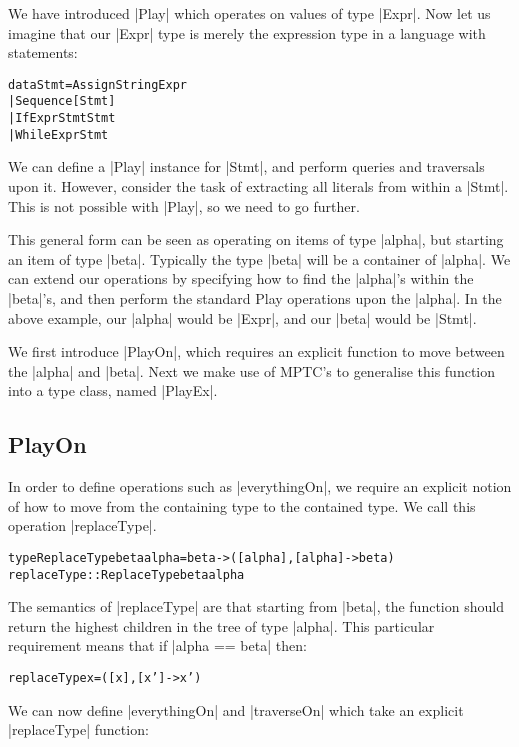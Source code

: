 \documentclass[preprint]{sigplanconf}
\newenvironment{code}{\begin{alltt}\small}{\end{alltt}}
\begin{document}
We have introduced |Play| which operates on values of type |Expr|. Now let us imagine that our |Expr| type is merely the expression type in a language with statements:

\begin{code}
data Stmt  =  Assign String Expr
           |  Sequence [Stmt]
           |  If Expr Stmt Stmt
           |  While Expr Stmt
\end{code}

We can define a |Play| instance for |Stmt|, and perform queries and traversals upon it. However, consider the task of extracting all literals from within a |Stmt|. This is not possible with |Play|, so we need to go further.

This general form can be seen as operating on items of type |alpha|, but starting an item of type |beta|. Typically the type |beta| will be a container of |alpha|. We can extend our operations by specifying how to find the |alpha|'s within the |beta|'s, and then perform the standard Play operations upon the |alpha|. In the above example, our |alpha| would be |Expr|, and our |beta| would be |Stmt|.

We first introduce |PlayOn|, which requires an explicit function to move between the |alpha| and |beta|. Next we make use of MPTC's to generalise this function into a type class, named |PlayEx|.

\subsection{PlayOn}

In order to define operations such as |everythingOn|, we require an explicit notion of how to move from the containing type to the contained type. We call this operation |replaceType|.

\begin{code}
type ReplaceType beta alpha = beta -> ([alpha], [alpha] -> beta)
replaceType :: ReplaceType beta alpha
\end{code}

The semantics of |replaceType| are that starting from |beta|, the function should return the highest children in the tree of type |alpha|. This particular requirement means that if |alpha == beta| then:

\begin{code}
replaceType x = ([x], [x'] -> x')
\end{code}

We can now define |everythingOn| and |traverseOn| which take an explicit |replaceType| function:
\end{document}

